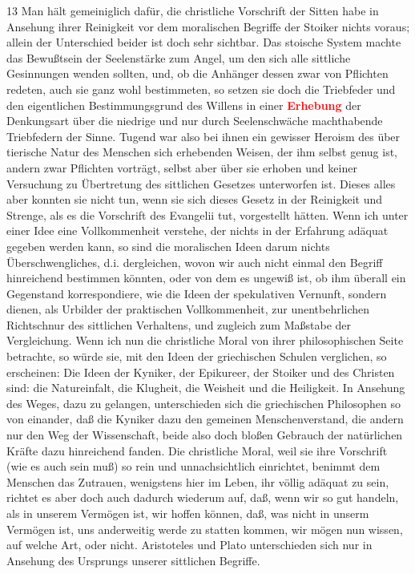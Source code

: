 \documentclass[a4paper,12pt,twoside]{book}
\newcommand{\match}[1]{\textcolor{red}{\textbf{#1}}}
\begin{document}
	13 Man hält gemeiniglich dafür, die christliche Vorschrift der Sitten habe in Ansehung ihrer Reinigkeit vor dem moralischen Begriffe der Stoiker nichts voraus; allein der Unterschied beider ist doch sehr sichtbar. Das stoische System machte das Bewußtsein der Seelenstärke zum Angel, um den sich alle sittliche Gesinnungen wenden sollten, und, ob die Anhänger dessen zwar von Pflichten redeten, auch sie ganz wohl bestimmeten, so setzen sie doch die Triebfeder und den eigentlichen Bestimmungsgrund des Willens in einer \match{Erhebung} der Denkungsart über die niedrige und nur durch Seelenschwäche machthabende Triebfedern der Sinne. Tugend war also bei ihnen ein gewisser Heroism des über tierische Natur des Menschen sich erhebenden Weisen, der ihm selbst genug ist, andern zwar Pflichten vorträgt, selbst aber über sie erhoben und keiner Versuchung zu Übertretung des sittlichen Gesetzes unterworfen ist. Dieses alles aber konnten sie nicht tun, wenn sie sich dieses Gesetz in der Reinigkeit und Strenge, als es die Vorschrift des Evangelii tut, vorgestellt hätten. Wenn ich unter einer Idee eine Vollkommenheit verstehe, der nichts in der Erfahrung adäquat gegeben werden kann, so sind die moralischen Ideen darum nichts Überschwengliches, d.i. dergleichen, wovon wir auch nicht einmal den Begriff hinreichend bestimmen könnten, oder von dem es ungewiß ist, ob ihm überall ein Gegenstand korrespondiere, wie die Ideen der spekulativen Vernunft, sondern dienen, als Urbilder der praktischen Vollkommenheit, zur unentbehrlichen Richtschnur des sittlichen Verhaltens, und zugleich zum Maßstabe der Vergleichung. Wenn ich nun die christliche Moral von ihrer philosophischen Seite betrachte, so würde sie, mit den Ideen der griechischen Schulen verglichen, so erscheinen: Die Ideen der Kyniker, der Epikureer, der Stoiker und des Christen sind: die Natureinfalt, die Klugheit, die Weisheit und die Heiligkeit. In Ansehung des Weges, dazu zu gelangen, unterschieden sich die griechischen Philosophen so von einander, daß die Kyniker dazu den gemeinen Menschenverstand, die andern nur den Weg der Wissenschaft, beide also doch bloßen Gebrauch der natürlichen Kräfte dazu hinreichend fanden. Die christliche Moral, weil sie ihre Vorschrift (wie es auch sein muß) so rein und unnachsichtlich einrichtet, benimmt dem Menschen das Zutrauen, wenigstens hier im Leben, ihr völlig adäquat zu sein, richtet es aber doch auch dadurch wiederum auf, daß, wenn wir so gut handeln, als in unserem Vermögen ist, wir hoffen können, daß, was nicht in unserm Vermögen ist, uns anderweitig werde zu statten kommen, wir mögen nun wissen, auf welche Art, oder nicht. Aristoteles und Plato unterschieden sich nur in Ansehung des Ursprungs unserer sittlichen Begriffe. 
	
\end{document}
